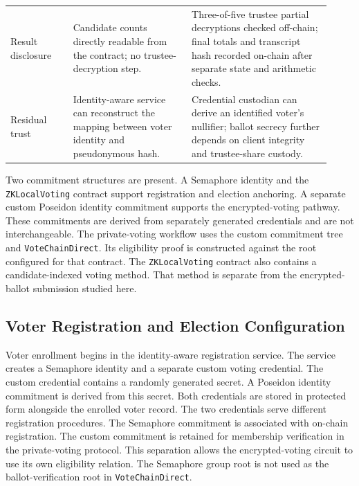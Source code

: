 \begin{table}[tbp]
\begin{tabular}{@{}>{\raggedright\arraybackslash}p{0.18\linewidth}>{\raggedright\arraybackslash}p{0.34\linewidth}>{\raggedright\arraybackslash}p{0.40\linewidth}@{}}
\addlinespace[3pt]
Result disclosure &
Candidate counts directly readable from the contract; no trustee-decryption step. &
Three-of-five trustee partial decryptions checked off-chain; final totals and transcript hash recorded on-chain after separate state and arithmetic checks. \\
\addlinespace[3pt]
Residual trust &
Identity-aware service can reconstruct the mapping between voter identity and pseudonymous hash. &
Credential custodian can derive an identified voter's nullifier; ballot secrecy further depends on client integrity and trustee-share custody. \\
\bottomrule
\end{tabular}
\end{table}

Two commitment structures are present. A Semaphore identity and the
\texttt{ZKLocalVoting} contract support registration and election anchoring.
A separate custom Poseidon identity commitment supports the encrypted-voting
pathway. These commitments are derived from separately generated credentials
and are not interchangeable.
The private-voting workflow uses the custom commitment tree and
\texttt{VoteChainDirect}. Its eligibility proof is constructed against the
root configured for that contract. The \texttt{ZKLocalVoting} contract also
contains a candidate-indexed voting method. That method is separate from the
encrypted-ballot submission studied here.


\subsection{Voter Registration and Election Configuration}
\label{subsec:architecture-registration}

Voter enrollment begins in the identity-aware registration service. The
service creates a Semaphore identity and a separate custom voting credential.
The custom credential contains a randomly generated secret. A Poseidon
identity commitment is derived from this secret. Both credentials are stored
in protected form alongside the enrolled voter record.
The two credentials serve different registration procedures. The Semaphore
commitment is associated with on-chain registration. The custom commitment
is retained for membership verification in the private-voting protocol. This
separation allows the encrypted-voting circuit to use its own eligibility
relation. The Semaphore group root is not used as the ballot-verification
root in \texttt{VoteChainDirect}.


